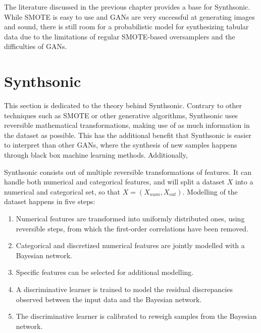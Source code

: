 The literature discussed in the previous chapter provides a base for Synthsonic. While SMOTE is easy to use and GANs are very successful at generating images and sound, there is still room for a probabilistic model for synthesizing tabular data due to the limitations of regular SMOTE-based oversamplers and the difficulties of GANs.

\section{Synthsonic}
This section is dedicated to the theory behind Synthsonic. Contrary to other techniques such as SMOTE or other generative algorithms, Synthsonic uses reversible mathematical transformations, making use of as much information in the dataset as possible. This has the additional benefit that Synthsonic is easier to interpret than other GANs, where the synthesis of new samples happens through black box machine learning methods. Additionally, 


Synthsonic consists out of multiple reversible transformations of features. It can handle both numerical and categorical features, and will split a dataset $X$ into a numerical and categorical set, so that $X = (X_{num}, X_{cat})$. Modelling of the dataset happens in five steps:

\begin{enumerate}
    \item Numerical features are transformed into uniformly distributed ones, using reversible steps, from which the first-order correlations have been removed.
    \item Categorical and discretized numerical features are jointly modelled with a Bayesian network.
    \item Specific features can be selected for additional modelling.
    \item A discriminative learner is trained to model the residual discrepancies observed between the input data and the Bayesian network.
    \item The discriminative learner is calibrated to reweigh samples from the Bayesian network.
\end{enumerate}

